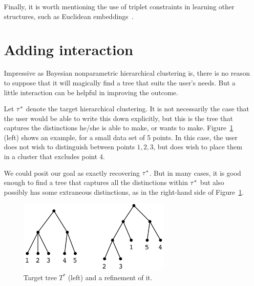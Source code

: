 Finally, it is worth mentioning the use of triplet constraints in learning other structures, such as Euclidean embeddings~\citep{Borg1997ModernApplications}.

\section{Adding interaction}

Impressive as Bayesian nonparametric hierarchical clustering is, there is no reason to suppose that it will magically find a tree that suits the user's needs. But a little interaction can be helpful in improving the outcome.

Let $\tau^*$ denote the target hierarchical clustering. It is not necessarily the case that the user would be able to write this down explicitly, but this is the tree that captures the distinctions he/she is able to make, or wants to make. Figure~\ref{fig:refinement} (left) shows an example, for a small data set of 5 points. In this case, the user does not wish to distinguish between points $1,2,3$, but does wish to place them in a cluster that excludes point $4$.

We could posit our goal as exactly recovering $\tau^*$. But in many cases, it is good enough to find a tree that captures all the distinctions within $\tau^*$ but also possibly has some extraneous distinctions, as in the right-hand side of Figure~\ref{fig:refinement}.

\begin{figure}
    \centering
    \includegraphics[width=3in]{img/ibhc/refinement.pdf}
    \caption{Target tree $T^*$ (left) and a refinement of it.}
    \label{fig:refinement}
\end{figure}

